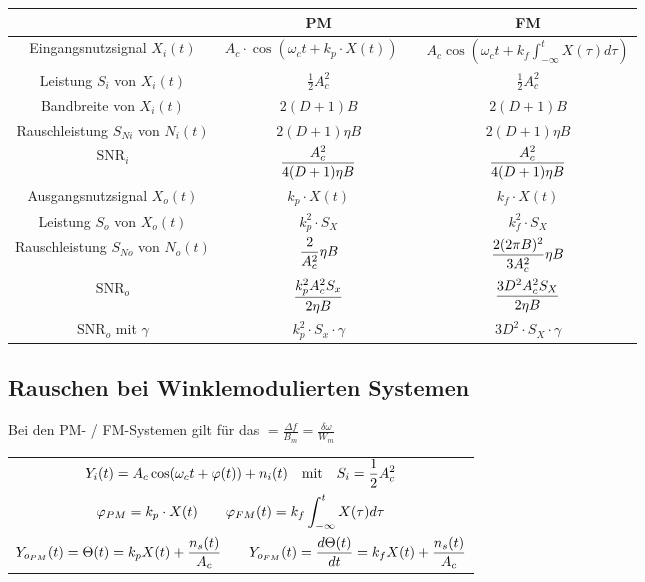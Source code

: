 \documentclass[a4paper]{article}
\begin{document}
\begin{twocolumn}
\begin{footnotesize}
\begin{tabular}{|c|c|c|}
  \hline & \textbf{PM} & \textbf{FM} \\ \hline
  Eingangsnutzsignal $X_i(t)$ & $A_c \cdot \cos(\omega_c t + k_p \cdot X(t)) \quad$ & $A_c \cos(\omega_c t + k_f \int_{-\infty}^t X(\tau) d\tau)$ \\\hline
  Leistung $S_i$ von $X_i(t)$ & $\frac{1}{2} A_c^2$ & $\frac{1}{2} A_c^2$ \\ \hline
  Bandbreite von $X_i(t)$ & $2(D + 1)B$ & $2(D + 1) B$ \\ \hline
  Rauschleistung $S_{Ni}$ von $N_i(t)$ & $2(D + 1)\eta B$ & $2(D + 1) \eta B$ \\ \hline
  $\text{SNR}_i$ & $\displaystyle \frac{A_c^2}{4(D+1)\eta B}$ &   $\displaystyle \frac{A_c^2}{4(D+1)\eta B}$ \\ \hline
  Ausgangsnutzsignal $X_o(t)$ & $k_p \cdot X(t)$ & $k_f \cdot X(t)$ \\ \hline
  Leistung $S_o$ von $X_o(t)$ & $k_p^2 \cdot S_X$ & $k_f^2 \cdot S_X$ \\ \hline
  Rauschleistung $S_{No}$ von $N_o(t)$ & $\displaystyle \frac{2}{A_c^2} \eta B$ & $\displaystyle \frac{2(2\pi B)^2}{3A_c^2} \eta B$ \\ \hline
  $\text{SNR}_o$ & $\displaystyle \frac{k_p^2 A_c^2 S_x}{2 \eta B}$ & $\displaystyle \frac{3 D^2 A_c^2 S_X}{2 \eta B}$ \\ \hline
  $\text{SNR}_o$ mit $\gamma$ & $k_p^2 \cdot S_x \cdot \gamma $ & $3 D^2 \cdot S_X \cdot \gamma$ \\ \hline
\end{tabular}
\end{footnotesize}


\subsection{Rauschen bei Winklemodulierten Systemen}

Bei den PM- / FM-Systemen gilt für das  $ = \frac{\Delta f}{B_m} = \frac{\delta \omega}{W_m}$ 

\begin{tabular}{c}
  $\displaystyle Y_i(t) = A_c \cos(\omega_c t + \varphi(t)) + n_i(t) \quad \text{mit} \quad S_i = \frac{1}{2} A_c^2$ \\
  $\displaystyle \varphi_{PM} = k_p \cdot X(t) \qquad \varphi_{FM}(t) = k_f \int_{-\infty}^t X(\tau) d\tau$\\
  $\displaystyle Y_{o_{PM}}(t) = \Theta(t) = k_p X(t) + \frac{n_s(t)}{A_c} \qquad Y_{o_{FM}}(t) = \frac{d\Theta(t)}{dt} = k_f X(t) + \frac{n_s(t)}{A_c}$
\end{tabular}



\end{twocolumn}
\end{document}
